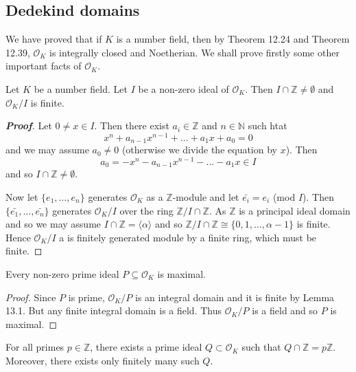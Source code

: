 \subsection{Dedekind domains}
We have proved that if $K$ is a number field, then by Theorem 12.24 and Theorem 12.39, $\mathcal{O}_K$ is integrally closed and Noetherian. We shall prove firstly some other important facts of $\mathcal{O}_K$.
\begin{lemma} Let $K$ be a number field. Let $I$ be a non-zero ideal of $\mathcal{O}_K$. Then $I \cap \mathbb{Z} \neq \emptyset$ and $\mathcal{O}_K/I$ is finite.
\end{lemma}
\begin{proof}[\bf Proof] Let $0 \neq x \in I$. Then there exist $a_i \in \mathbb{Z}$ and $n \in \mathbb{N}$ such htat
$$x^n+a_{n-1}x^{n-1}+\ldots+a_1x+a_0=0$$
and we may assume $a_0 \neq 0$ (otherwise we divide the equation by $x$). Then
$$a_0 = -x^n-a_{n-1}x^{n-1}-\ldots-a_1x \in I$$
and so $I \cap \mathbb{Z} \neq \emptyset$.

Now let $\{e_1,\ldots,e_n\}$ generates $\mathcal{O}_K$ as a $\mathbb{Z}$-module and let $\bar{e_i}=e_i$ (mod $I$).
Then $\{\bar{e_1},\ldots,\bar{e_n}\}$ generates $\mathcal{O}_K/I$ over the ring $\mathbb{Z}/I \cap \mathbb{Z}$.
As $\mathbb{Z}$ is a principal ideal domain and so we may assume $I \cap \mathbb{Z}=\langle \alpha \rangle$ and so
$\mathbb{Z}/I \cap \mathbb{Z} \cong \{0,1,\ldots,\alpha-1\}$ is finite. Hence $\mathcal{O}_K/I$ a is finitely generated module by a finite ring, which must be finite.
\end{proof}
\begin{theorem} Every non-zero prime ideal $P \subseteq \mathcal{O}_K$ is maximal.
\end{theorem}
\begin{proof}Since $P$ is prime, $\mathcal{O}_K/P$ is an integral domain and it is finite by Lemma 13.1. But any finite integral domain is a field. Thus $\mathcal{O}_K/P$ is a field and so $P$ is maximal.
\end{proof}
\begin{theorem} For all primes $p \in \mathbb{Z}$, there exists a prime ideal $Q \subset \mathcal{O}_K$ such that
$Q \cap \mathbb{Z} = p\mathbb{Z}$. Moreover, there exists only finitely many such $Q$.
\end{theorem}
